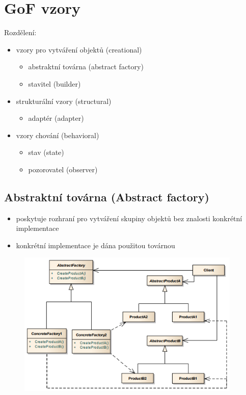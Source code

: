 \documentclass{szzclass}
\begin{document}
\section{GoF vzory}
Rozdělení:
\begin{itemize}
    \item vzory pro vytváření objektů (creational)
    \begin{itemize}
        \item abstraktní továrna (abstract factory)
        \item stavitel (builder)
    \end{itemize}
    \item strukturální vzory (structural)
    \begin{itemize}
        \item adaptér (adapter)
    \end{itemize}
    \item vzory chování (behavioral)
    \begin{itemize}
        \item stav (state)
        \item pozorovatel (observer)
    \end{itemize}
\end{itemize}
\subsection{Abstraktní továrna (Abstract factory)}
\begin{itemize}
    \item poskytuje rozhraní pro vytváření skupiny objektů bez znalosti konkrétní implementace
    \item konkrétní implementace je dána použitou továrnou
\end{itemize}
\begin{figure}[h!]
    \includegraphics[width=0.95\textwidth]{topics/bi-wsi-si-19/images/abstractFactory.png}
\end{figure}
\end{document}
